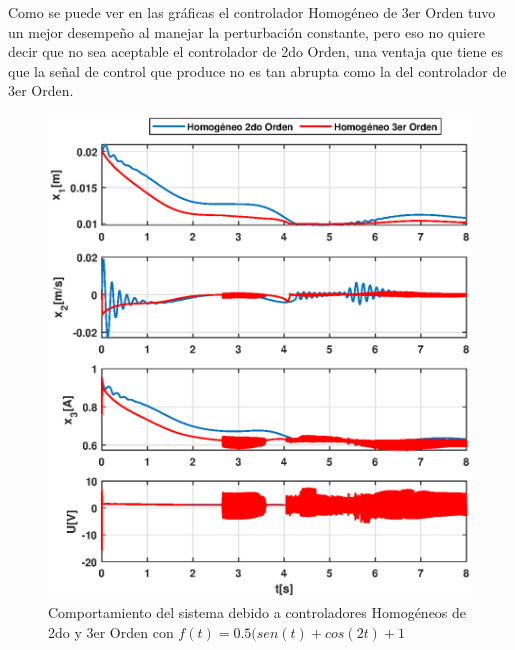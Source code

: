 \documentclass[onecolumn,10pt]{article}
\begin{document}
\\
\\
\\
\\
\\
Como se puede ver en las gr\'aficas el controlador Homog\'eneo de 3er Orden tuvo un mejor desempe\~no al manejar la perturbaci\'on constante, pero eso no quiere decir que no sea aceptable el controlador de 2do Orden, una ventaja que tiene es que la se\~nal de control que produce no es tan abrupta como la del controlador de 3er Orden.
\begin{figure}[!h]
\centering
\includegraphics[scale=0.55]{xu_3o_h23o_pv.eps}
\caption{Comportamiento del sistema debido a controladores Homog\'eneos de 2do y 3er Orden con $f(t)=0.5(sen(t)+cos(2t)+1$}
\end{figure}
\\
\\
\\
\\
\\
\\
\\
\\
\\
\end{document}
